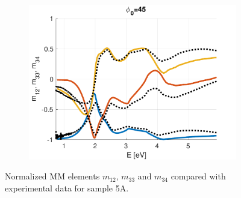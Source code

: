 \begin{figure}[h!]
\begin{subfigure}{0.32\linewidth}
        \includegraphics[width=\linewidth, trim= 0cm 0cm 0cm 0cm, clip]{figures/ch4/S5A/S5A_NCS_phi45.pdf}
   \end{subfigure}
   \caption{Normalized MM elements $m_{12}$, $m_{33}$ and $m_{34}$ compared with experimental data for sample 5A.}
   \label{fig:S5A_NCS}
\end{figure}

